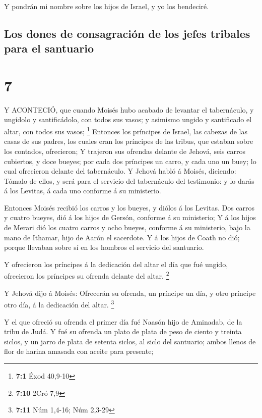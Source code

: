  Y pondrán mi nombre sobre los hijos de Israel, y yo los
bendeciré.

\hypertarget{los-dones-de-consagraciuxf3n-de-los-jefes-tribales-para-el-santuario}{%
\subsection{Los dones de consagración de los jefes tribales para el
santuario}\label{los-dones-de-consagraciuxf3n-de-los-jefes-tribales-para-el-santuario}}

\hypertarget{section-6}{%
\section{7}\label{section-6}}

 Y ACONTECIÓ, que cuando Moisés hubo acabado de levantar el
tabernáculo, y ungídolo y santificádolo, con todos sus vasos; y asimismo
ungido y santificado el altar, con todos sus vasos; \footnote{\textbf{7:1}
  Éxod 40,9-10}  Entonces los príncipes de Israel, las
cabezas de las casas de sus padres, los cuales eran los príncipes de las
tribus, que estaban sobre los contados, ofrecieron;  Y
trajeron sus ofrendas delante de Jehová, seis carros cubiertos, y doce
bueyes; por cada dos príncipes un carro, y cada uno un buey; lo cual
ofrecieron delante del tabernáculo.  Y Jehová habló á
Moisés, diciendo:  Tómalo de ellos, y será para el servicio
del tabernáculo del testimonio: y lo darás á los Levitas, á cada uno
conforme á su ministerio.

 Entonces Moisés recibió los carros y los bueyes, y diólos á
los Levitas.  Dos carros y cuatro bueyes, dió á los hijos de
Gersón, conforme á su ministerio;  Y á los hijos de Merari
dió los cuatro carros y ocho bueyes, conforme á su ministerio, bajo la
mano de Ithamar, hijo de Aarón el sacerdote.  Y á los hijos
de Coath no dió; porque llevaban sobre sí en los hombros el servicio del
santuario.

 Y ofrecieron los príncipes á la dedicación del altar el
día que fué ungido, ofrecieron los príncipes su ofrenda delante del
altar. \footnote{\textbf{7:10} 2Cró 7,9}

 Y Jehová dijo á Moisés: Ofrecerán su ofrenda, un príncipe
un día, y otro príncipe otro día, á la dedicación del altar. \footnote{\textbf{7:11}
  Núm 1,4-16; Núm 2,3-29}

 Y el que ofreció su ofrenda el primer día fué Naasón hijo
de Aminadab, de la tribu de Judá.  Y fué su ofrenda un
plato de plata de peso de ciento y treinta siclos, y un jarro de plata
de setenta siclos, al siclo del santuario; ambos llenos de flor de
harina amasada con aceite para presente;

